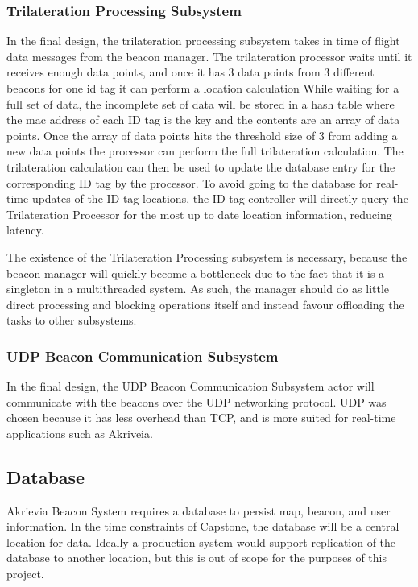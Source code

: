 \subsubsection{Trilateration Processing Subsystem}
\medskip
In the final design, the trilateration processing subsystem takes in time of flight data messages from the beacon manager.
The trilateration processor waits until it receives enough data points, and once it has 3 data points from 3 different beacons for one id tag it can perform a location calculation
While waiting for a full set of data, the incomplete set of data will be stored in a hash table where the mac address of each ID tag is the key and the contents are an array of data points.
Once the array of data points hits the threshold size of 3 from adding a new data points the processor can perform the full trilateration calculation.
The trilateration calculation can then be used to update the database entry for the corresponding ID tag by the processor.
To avoid going to the database for real-time updates of the ID tag locations, the ID tag controller will directly query the Trilateration Processor for the most up to date location information, reducing latency.

\bigskip
The existence of the Trilateration Processing subsystem is necessary, because the beacon manager will quickly become a bottleneck due to the fact that it is a singleton in a multithreaded system.
As such, the manager should do as little direct processing and blocking operations itself and instead favour offloading the tasks to other subsystems.

\medskip
\subsubsection{UDP Beacon Communication Subsystem}
\medskip
In the final design, the UDP Beacon Communication Subsystem actor will communicate with the beacons over the UDP networking protocol.
UDP was chosen because it has less overhead than TCP, and is more suited for real-time applications such as Akriveia.

\medskip
\subsection{Database}
\medskip
Akrievia Beacon System requires a database to persist map, beacon, and user information.
In the time constraints of Capstone, the database will be a central location for data. Ideally a production system would support replication of the database to another location, but this is out of scope for the purposes of this project.


